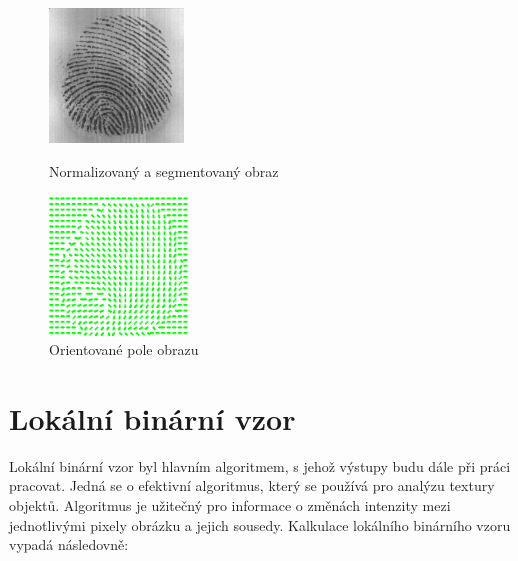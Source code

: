 \begin{figure}[htbp]
  \begin{minipage}[b]{0.5\linewidth}
    \centering
    \includegraphics[width=135]{obrazky-figures/norm_img.png}
    \caption{Normalizovaný a segmentovaný obraz}
    \label{fig:origimg}
  \end{minipage}
  \hspace{0.5cm}
  \begin{minipage}[b]{0.5\linewidth}
    \centering
    \includegraphics[width=140]{obrazky-figures/orient.png}
    \caption{Orientované pole obrazu}
    \label{fig:normimg}
  \end{minipage}
\end{figure}



\section{Lokální binární vzor}
Lokální binární vzor byl hlavním algoritmem, s jehož výstupy budu dále při práci pracovat. Jedná se o efektivní algoritmus, který se používá pro analýzu textury objektů.  Algoritmus je užitečný pro informace o změnách intenzity mezi jednotlivými pixely obrázku a jejich sousedy. Kalkulace lokálního binárního vzoru vypadá následovně:\cite{GaikwadStudy}

